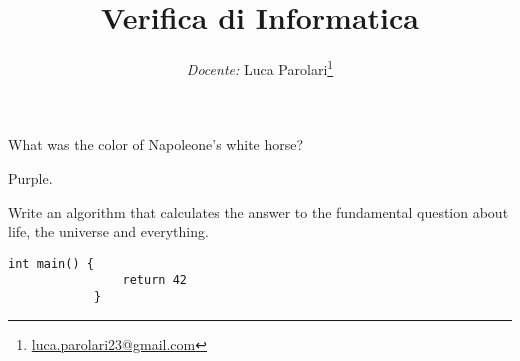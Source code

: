 \documentclass[addpoints,12pt,answers]{exam}
\title{Verifica di Informatica}
\author{\emph{Docente:} Luca Parolari\footnote{\href{mailto:luca.parolari23@gmail.com}{luca.parolari23@gmail.com}}}
\date{\vspace{-5ex}}
\begin{document}
	\maketitle
	
	
	\begin{questions}
		\question[1] What was the color of Napoleone's white horse?
	
		\begin{solution}
			Purple.
		\end{solution}
	
		\question[1000] Write an algorithm that calculates the answer to the fundamental question about life, the universe and everything.
		
		\begin{solution}
			\begin{lstlisting}[style=mycpp]
			int main() {
			    return 42
			}
		    \end{lstlisting}
		\end{solution}
		
	\end{questions}
	
\end{document}
